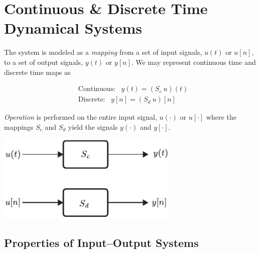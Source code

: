 \documentclass[12pt,oneside]{amsart}
\begin{document}
\newpage

\section{Continuous \& Discrete Time Dynamical Systems} 

The system is modeled as a \textit{mapping} from a set of input
signals, $u(t)$ or $u[n]$, to a set of output signals, $y(t)$ or $y[n]$.
We may represent continuous time and discrete time maps as

\begin{align*}
  &\mathrm{Continuous}: \ \ \ y(t) = (S_c \ u) (t) \\
  &\mathrm{Discrete}: \ \ \ y[n] = (S_d \ u) [n] 
\end{align*}

\vspace{6pt}

\textit{Operation} is performed on the entire input signal, $u(\cdot)$ or
$u[\cdot]$ where the mappings $S_c$ and $S_d$ yield the signals
$y(\cdot)$ and $y[\cdot]$. 

\vspace{12pt}

    \begin{center}
  \begin{minipage}[h]{0.9\linewidth}
    \begin{center}
      \includegraphics[width=0.65\textwidth]{blocks}
    \end{center}
  \end{minipage}
    \end{center}

\vspace{12pt}

\subsection{Properties of Input--Output Systems}
\end{document}
